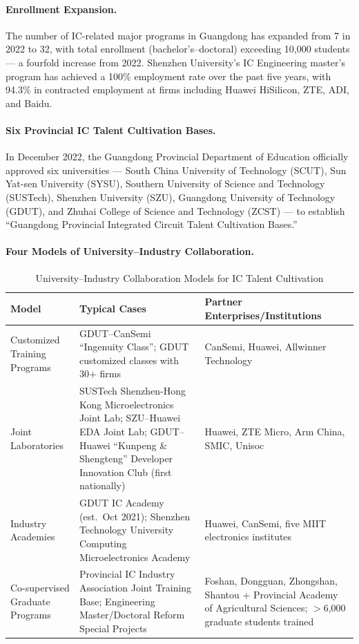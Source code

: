 \documentclass[12pt,a4paper]{article}
\newcommand{\tableHeaderRow}{\rowcolor{tealPrimary}\color{white}}
\newcommand{\tableOddRow}{\rowcolor{mintBG}}
\newcommand{\tableEvenRow}{\rowcolor{white}}
\begin{document}
\paragraph{Enrollment Expansion.} The number of IC-related major programs in
Guangdong has expanded from 7 in 2022 to 32, with total enrollment
(bachelor's--doctoral) exceeding 10,000 students — a fourfold increase from
2022. Shenzhen University's IC Engineering master's program has achieved a
100\% employment rate over the past five years, with 94.3\% in contracted
employment at firms including Huawei HiSilicon, ZTE, ADI, and Baidu.

\paragraph{Six Provincial IC Talent Cultivation Bases.} In December 2022, the
Guangdong Provincial Department of Education officially approved six
universities — South China University of Technology (SCUT), Sun Yat-sen
University (SYSU), Southern University of Science and Technology (SUSTech),
Shenzhen University (SZU), Guangdong University of Technology (GDUT), and
Zhuhai College of Science and Technology (ZCST) — to establish ``Guangdong
Provincial Integrated Circuit Talent Cultivation Bases.''

\paragraph{Four Models of University--Industry Collaboration.}

\begin{table}[H]
\centering
\caption{University--Industry Collaboration Models for IC Talent Cultivation}
\label{tab:u-i_models}
\begin{tabular}{p{2.8cm}p{5.6cm}p{5.2cm}}
\toprule
\tableHeaderRow
\textbf{Model} & \textbf{Typical Cases} & \textbf{Partner Enterprises/Institutions} \\
\midrule
\tableOddRow  Customized Training Programs & GDUT--CanSemi ``Ingenuity Class''; GDUT customized classes with 30+ firms & CanSemi, Huawei, Allwinner Technology \\
\tableEvenRow Joint Laboratories & SUSTech Shenzhen-Hong Kong Microelectronics Joint Lab; SZU--Huawei EDA Joint Lab; GDUT--Huawei ``Kunpeng \& Shengteng'' Developer Innovation Club (first nationally) & Huawei, ZTE Micro, Arm China, SMIC, Unisoc \\
\tableOddRow  Industry Academies & GDUT IC Academy (est.\ Oct 2021); Shenzhen Technology University Computing Microelectronics Academy & Huawei, CanSemi, five MIIT electronics institutes \\
\tableEvenRow Co-supervised Graduate Programs & Provincial IC Industry Association Joint Training Base; Engineering Master/Doctoral Reform Special Projects & Foshan, Dongguan, Zhongshan, Shantou + Provincial Academy of Agricultural Sciences; $>$6,000 graduate students trained \\
\bottomrule
\end{tabular}
\end{table}
\end{document}
